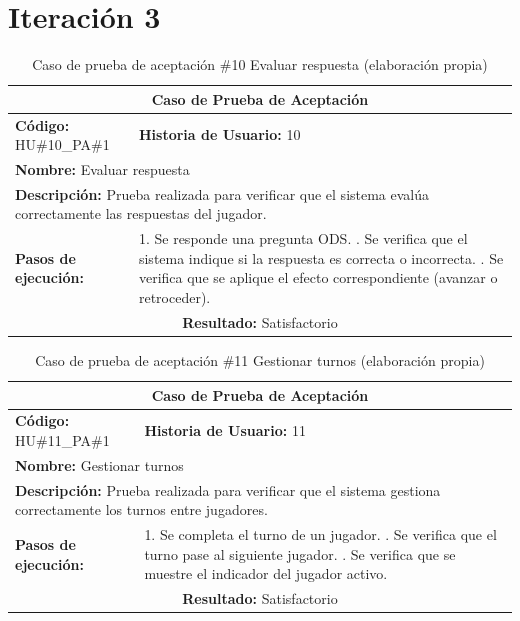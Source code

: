 \section*{Iteración 3}

\begin{table}[H]
\centering
\caption{Caso de prueba de aceptación \#10 Evaluar respuesta (elaboración propia)\label{tab:cpa10}}
\renewcommand{\arraystretch}{1.3}
\begin{tabular}{|p{}|p{}|}
\hline
\multicolumn{2}{|c|}{\textbf{Caso de Prueba de Aceptación}} \\
\hline
\textbf{Código:} HU\#10\_PA\#1 & \textbf{Historia de Usuario:} 10 \\
\hline
\multicolumn{2}{|l|}{\textbf{Nombre:} Evaluar respuesta} \\
\hline
\multicolumn{2}{|p{0.9\textwidth}|}{\textbf{Descripción:} Prueba realizada para verificar que el sistema evalúa correctamente las respuestas del jugador.} \\
\hline
\textbf{Pasos de ejecución:} & 1. Se responde una pregunta ODS. \newline 2. Se verifica que el sistema indique si la respuesta es correcta o incorrecta. \newline 3. Se verifica que se aplique el efecto correspondiente (avanzar o retroceder). \\
\hline
\multicolumn{2}{|c|}{\textbf{Resultado:} Satisfactorio} \\
\hline
\end{tabular}
\end{table}

\begin{table}[H]
\centering
\caption{Caso de prueba de aceptación \#11 Gestionar turnos (elaboración propia)\label{tab:cpa11}}
\renewcommand{\arraystretch}{1.3}
\begin{tabular}{|p{}|p{}|}
\hline
\multicolumn{2}{|c|}{\textbf{Caso de Prueba de Aceptación}} \\
\hline
\textbf{Código:} HU\#11\_PA\#1 & \textbf{Historia de Usuario:} 11 \\
\hline
\multicolumn{2}{|l|}{\textbf{Nombre:} Gestionar turnos} \\
\hline
\multicolumn{2}{|p{0.9\textwidth}|}{\textbf{Descripción:} Prueba realizada para verificar que el sistema gestiona correctamente los turnos entre jugadores.} \\
\hline
\textbf{Pasos de ejecución:} & 1. Se completa el turno de un jugador. \newline 2. Se verifica que el turno pase al siguiente jugador. \newline 3. Se verifica que se muestre el indicador del jugador activo. \\
\hline
\multicolumn{2}{|c|}{\textbf{Resultado:} Satisfactorio} \\
\hline
\end{tabular}
\end{table}

